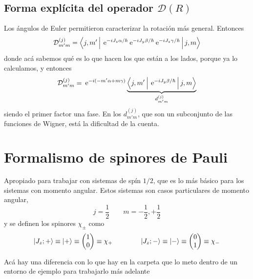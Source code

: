 \documentclass[10pt,oneside]{CBFT_book}
\begin{document}

\subsection{Forma explícita del operador $\mathcal{D}(R)$}

Los ángulos de Euler permitieron caracterizar la rotación más general. Entonces 
\[
	\mathcal{D}^{(j)}_{m' m} = 
	\Braket{j,m'|\:\mathrm{e}^{-iJ_z\alpha/\hbar} \:\mathrm{e}^{-iJ_y\beta/\hbar} \:\mathrm{e}^{-iJ_z\gamma/\hbar} |j,m}
\]
donde acá sabemos qué es lo que hacen los que están a los lados, porque ya lo calculamos, y
entonces
\[
	\mathcal{D}^{(j)}_{m' m} = \:\mathrm{e}^{-i(-m'\alpha + m\gamma)}
	\underbrace{\Braket{j,m'| \:\mathrm{e}^{-iJ_y\beta/\hbar}  |j,m}}_{d_{m'm}^{(j)}}
\]
siendo el primer factor una fase.
En los $d_{m'm}^{(j)}$, que son un subconjunto de las funciones de Wigner, está la dificultad de la cuenta.

\section{Formalismo de spinores de Pauli}

Apropiado para trabajar con sistemas de spín $1/2$, que es lo más básico para los sistemas con
momento angular.
Estos sistemas son casos particulares de momento angular,
\[
	j = \frac 1 2 \qquad m=-\frac{1}{2},+\frac{1}{2}
\]
y se definen los spinores $\chi_\pm$ como
\[
	\Ket{J_z;+} \equiv \Ket{+} \equiv  
	\begin{pmatrix} 1 \\ 0  \end{pmatrix} \equiv  \chi_+ 
	\qquad \qquad
	\Ket{J_z;-} \equiv \Ket{-} \equiv  
	\begin{pmatrix} 0 \\ 1  \end{pmatrix} \equiv  \chi_-
\]

Acá hay una diferencia con lo que hay en la carpeta que lo meto dentro de un entorno de
ejemplo para trabajarlo más adelante
\end{document}
